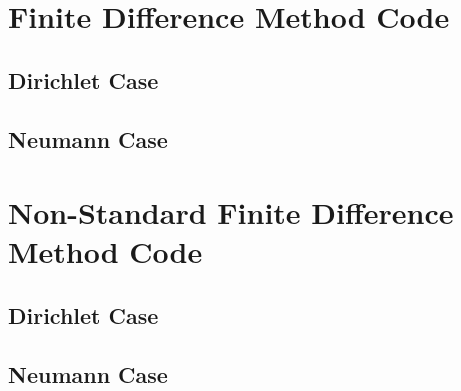 \documentclass[a4paper]{article}
\begin{document}
\section{Finite Difference Method Code}
\subsection{Dirichlet Case}

\subsection{Neumann Case}


\break
\section{Non-Standard Finite Difference Method Code}

\subsection{Dirichlet Case}

\subsection{Neumann Case}

\end{document}
